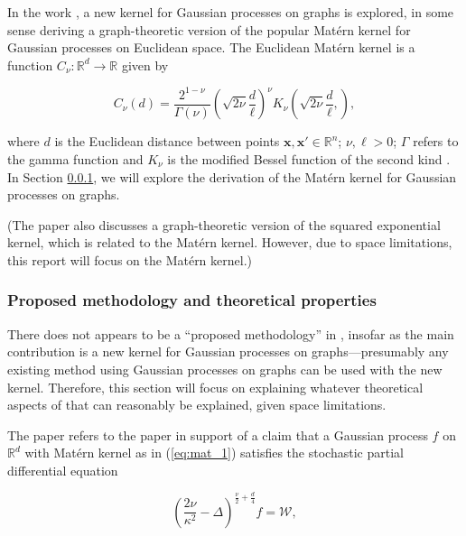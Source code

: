 In the work \cite{pmlr-v130-borovitskiy21a}, a new kernel for Gaussian processes on graphs is explored, in some sense deriving a graph-theoretic version of the popular Mat\'{e}rn kernel for Gaussian processes on Euclidean space. The Euclidean Mat\'{e}rn kernel is a function $C_{\nu} \colon \mathbb R^d \to \mathbb R$ given by

\begin{equation}\label{eq:mat_1}
    C_{\nu}(d) = \frac{2^{1 - \nu}}{\Gamma(\nu)} \left(\sqrt{2 \nu} \frac{d}{\ell}\right)^{\nu} K_{\nu}\left(\sqrt{2 \nu} \frac{d}{\ell},\right),
\end{equation}

where $d$ is the Euclidean distance between points $\bm x, \bm x' \in \mathbb R^n$; $\nu, \ell > 0$; $\Gamma$ refers to the gamma function and $K_{\nu}$ is the modified Bessel function of the second kind \cite{rw}. In Section \ref{sec:method}, we will explore the derivation of the Mat\'{e}rn kernel for Gaussian processes on graphs.

(The paper \cite{pmlr-v130-borovitskiy21a} also discusses a graph-theoretic version of the squared exponential kernel, which is related to the Mat\'{e}rn kernel. However, due to space limitations, this report will focus on the Mat\'{e}rn kernel.)

\subsubsection{Proposed methodology and theoretical properties}\label{sec:method}

There does not appears to be a ``proposed methodology'' in \cite{pmlr-v130-borovitskiy21a}, insofar as the main contribution is a new kernel for Gaussian processes on graphs---presumably any existing method using Gaussian processes on graphs can be used with the new kernel. Therefore, this section will focus on explaining whatever theoretical aspects of \cite{pmlr-v130-borovitskiy21a} that can reasonably be explained, given space limitations.

The paper \cite{pmlr-v130-borovitskiy21a} refers to the paper \cite{whittle1963stochastic} in support of a claim that a Gaussian process $f$ on $\mathbb R^d$ with Mat\'{e}rn kernel as in (\ref{eq:mat_1}) satisfies the stochastic partial differential equation

\begin{equation}\label{eq:spde_mat}
    \left(\frac{2\nu}{\kappa^2} - \Delta\right)^{\frac{\nu}{2} + \frac{d}{4}}f = \mathcal W,
\end{equation}

